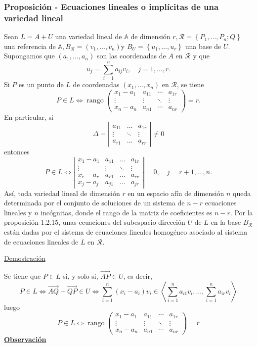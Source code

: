 \documentclass[12pt, a4paper, ones, notitlepage, openany,titlepage]{article}
\newcommand{\demostracion}{\noindent\underline{Demostración}}
\newcommand{\observacion}{\noindent\underline{\textbf{Observación}}}
\begin{document}
\subsubsection{Proposición - Ecuaciones lineales o implícitas de una variedad lineal}
Sean $L=A+U$ una variedad lineal de $\mathbb{A}$ de dimensión $r, \mathcal{R}=\left\{P_{1}, \ldots, P_{n} ; Q\right\}$ una referencia de $\mathbb{A}, B_{\mathcal{R}}=\left(v_{1}, \ldots, v_{n}\right) \mathrm{y}$ $B_{U}=\left\{u_{1}, \ldots, u_{r}\right\}$ una base de $U$. Supongamos que $\left(a_{1}, \ldots, a_{n}\right)$ son las coordenadas de $A$ en $\mathcal{R}$ y que
$$
u_{j}=\sum_{i=1}^{n} a_{i j} v_{i}, \quad j=1, \ldots, r .
$$
\noindent Si $P$ es un punto de $L$ de coordenadas $\left(x_{1}, \ldots, x_{n}\right)$ en $\mathcal{R}$, se tiene
$$
P \in L \Longleftrightarrow \operatorname{rango}\left(\begin{array}{cccc}
x_{1}-a_{1} & a_{11} & \cdots & a_{1 r} \\
\vdots & \vdots & \ddots & \vdots \\
x_{n}-a_{n} & a_{n 1} & \cdots & a_{n r}
\end{array}\right)=r .
$$
\noindent En particular, si
$$
\Delta=\left|\begin{array}{ccc}
a_{11} & \ldots & a_{1 r} \\
\vdots & \ddots & \vdots \\
a_{r 1} & \ldots & a_{r r}
\end{array}\right| \neq 0
$$
\noindent entonces
$$
P \in L \Longleftrightarrow\left|\begin{array}{rrrr}
x_{1}-a_{1} & a_{11} & \ldots & a_{1 r} \\
\vdots & \vdots & \ddots & \vdots \\
x_{r}-a_{r} & a_{r 1} & \ldots & a_{r r} \\
x_{j}-a_{j} & a_{j 1} & \ldots & a_{j r}
\end{array}\right|=0, \quad j=r+1, \ldots, n .
$$
\noindent Así, toda variedad lineal de dimensión $r$ en un espacio afín de dimensión $n$ queda determinada por el conjunto de soluciones de un sistema de $n-r$ ecuaciones lineales y $n$ incógnitas, donde el rango de la matriz de coeficientes es $n-r$. Por la proposición 1.2.15, unas ecuaciones del subespacio dirección $U$ de $L$ en la base $B_{\mathcal{R}}$ están dadas por el sistema de ecuaciones lineales homogéneo asociado al sistema de ecuaciones lineales de $L$ en $\mathcal{R}$.

\demostracion

Se tiene que $P \in L$ si, y solo si, $\overrightarrow{A P} \in U$, es decir,
$$
P \in L \Longleftrightarrow \overrightarrow{A Q}+\overrightarrow{Q P} \in U \Longleftrightarrow \sum_{i=1}^{n}\left(x_{i}-a_{i}\right) v_{i} \in\left\langle\sum_{i=1}^{n} a_{i 1} v_{i}, \ldots, \sum_{i=1}^{n} a_{i r} v_{i}\right\rangle
$$
\noindent luego
$$
P \in L \Longleftrightarrow \operatorname{rango}\left(\begin{array}{cccc}
x_{1}-a_{1} & a_{11} & \cdots & a_{1 r} \\
\vdots & \vdots & \ddots & \vdots \\
x_{n}-a_{n} & a_{n 1} & \cdots & a_{n r}
\end{array}\right)=r
$$
\observacion
\end{document}
